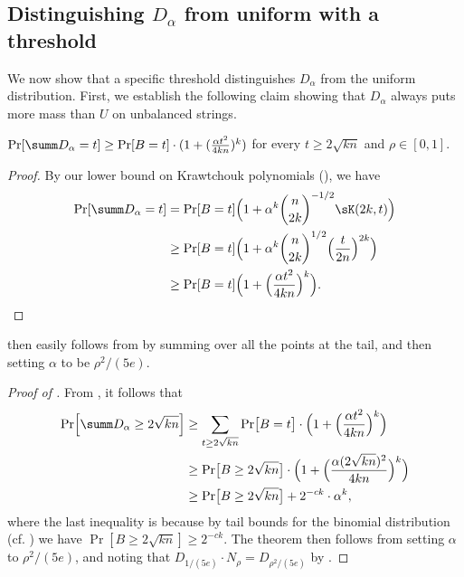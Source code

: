 \subsection{Distinguishing $D_\alpha$ from uniform with a threshold}
We now show that a specific threshold distinguishes $D_\alpha$ from the uniform distribution.
First, we establish the following claim showing that $D_{\alpha}$ always puts more mass than $U$ on unbalanced strings.

\begin{claim} \label{claim:ptwise-lb}
  $\Pr[\summ D_\alpha = t] \ge \Pr[ B = t ] \cdot (1 + (\frac{\alpha t^2}{4kn})^k)$ for every $t \ge 2\sqrt{kn}$ and $\rho \in [0,1]$.
\end{claim}

\begin{proof}
  By our lower bound on Krawtchouk polynomials (), we have
  \begin{align*}
    \Pr[\summ D_\alpha = t]
    &= \Pr[ B = t ] \Bigl( 1 + \alpha^k \binom{n}{2k}^{-1/2} \sK(2k,t) \Bigr)  \\
    &\ge \Pr[ B = t ] \Bigl( 1 + \alpha^k \binom{n}{2k}^{1/2} \Bigl(\frac{t}{2n}\Bigr)^{2k} \Bigr)  \\
    &\ge \Pr[ B = t ] \Bigl( 1 + \Bigl(\frac{\alpha t^2}{4kn}\Bigr)^{k} \Bigr) . \qedhere
  \end{align*}
\end{proof}

 then easily follows from  by summing over all the points at the tail, and then setting $\alpha$ to be $\rho^2/(5e)$.
\begin{proof}[Proof of ]
  From , it follows that
  \begin{align*}
    \Pr\Bigl[ \summ D_\alpha \ge 2\sqrt{kn} \Bigr]
    &\ge \sum_{t \ge 2\sqrt{kn}} \Pr\bigl[ B = t \bigr] \cdot \Bigl(1 + \Bigl(\frac{\alpha t^2}{4kn}\Bigr)^k \Bigr) \\
    &\ge \Pr\bigl[ B \ge 2\sqrt{kn} \bigr] \cdot \Bigl(1 + \Bigl(\frac{\alpha (2\sqrt{kn})^2}{4kn}\Bigr)^k \Bigr) \\
    &\ge \Pr\bigl[ B \ge 2\sqrt{kn}\bigr] + 2^{-ck} \cdot \alpha^k ,
  \end{align*}
  where the last inequality is because by tail bounds for the binomial distribution (cf. \cite{Ahle-book}) we have $\Pr[ B \ge 2\sqrt{kn}] \ge 2^{-ck}$.
  The theorem then follows from setting $\alpha$ to $\rho^2/(5e)$, and noting that $D_{1/(5e)} \cdot N_{\rho} = D_{\rho^2/(5e)}$ by .
\end{proof}

